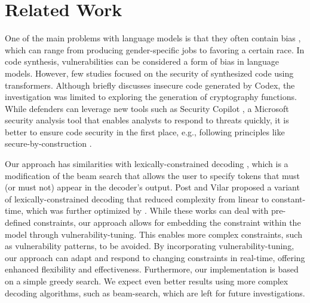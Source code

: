 \documentclass[12pt]{book}
\begin{document}
\section{Related Work}
\label{chap:related-work}

\newcommand*\emptycirc[1][1ex]{\tikz\draw (0,0) circle (#1);} 
\newcommand*\halfcirc[1][1ex]{%
  \begin{tikzpicture}
  \draw[fill] (0,0)-- (90:#1) arc (90:270:#1) -- cycle ;
  \draw (0,0) circle (#1);
  \end{tikzpicture}}
\newcommand*\fullcirc[1][1ex]{\tikz\fill (0,0) circle (#1);} 

One of the main problems with language models is that they often contain bias \cite{li2021detecting}, which can range from producing gender-specific jobs to favoring a certain race. In code synthesis, vulnerabilities can be considered a form of bias in language models. However, few studies focused on the security of synthesized code using transformers. Although \citet{chen2021codex} briefly discusses insecure code generated by Codex, the investigation was limited to exploring the generation of cryptography functions. While defenders can leverage new tools such as Security Copilot \cite{securitycopilot}, a Microsoft security analysis tool that enables analysts to respond to threats quickly, it is better to ensure code security in the first place, e.g., following principles like secure-by-construction \cite{securebyconstruction}.

Our approach has similarities with lexically-constrained decoding \cite{hokamp2017lexically}, which is a modification of the beam search that allows the user to specify tokens that must (or must not) appear in the decoder’s output. Post and Vilar \citet{post2018fast} proposed a variant of lexically-constrained decoding that reduced complexity from linear to constant-time, which was further optimized by \citet{hu2019improved}. While these works can deal with pre-defined constraints, our approach allows for embedding the constraint within the model through vulnerability-tuning. This enables more complex constraints, such as vulnerability patterns, to be avoided. By incorporating vulnerability-tuning, our approach can adapt and respond to changing constraints in real-time, offering enhanced flexibility and effectiveness. Furthermore, our implementation is based on a simple greedy search. We expect even better results using more complex decoding algorithms, such as beam-search, which are left for future investigations.
\end{document}
